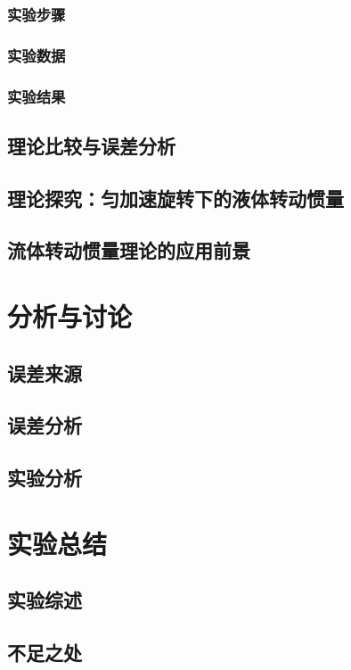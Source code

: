 \documentclass[12pt,hyperref,a4paper,UTF8]{ctexart}
\begin{document}
\subsubsection{实验步骤}

\subsubsection{实验数据}

\subsubsection{实验结果}
\subsection{理论比较与误差分析}
\subsection{理论探究：匀加速旋转下的液体转动惯量}
\subsection{流体转动惯量理论的应用前景}



\section{分析与讨论}
\subsection{误差来源}

\subsection{误差分析}

\subsection{实验分析}


\section{实验总结}
\subsection{实验综述}

\subsection{不足之处}
\end{document}
